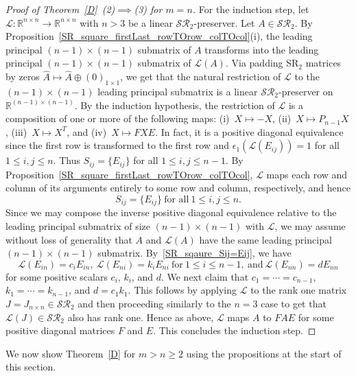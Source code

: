 \documentclass[11pt,reqno]{amsart}
\theoremstyle{plain}
\theoremstyle{definition}
\numberwithin{equation}{section}
\begin{document}
\begin{proof}[Proof of Theorem~\ref{D}~(2)$\implies$(3) for $m=n$]
	For the induction step, let $\mathcal{L}:\mathbb{R}^{n\times n}\to\mathbb{R}^{n\times n}$ with $n>3$ be a linear $\mathcal{SR}_2$-preserver. Let $A\in \mathcal{SR}_2$. By Proposition~\ref{SR_square_firstLast_rowTOrow_colTOcol}(i), the leading principal $(n-1)\times (n-1)$ submatrix of $A$ transforms into the leading principal $(n-1)\times (n-1)$  submatrix of $\mathcal{L}(A)$. Via padding SR$_2$ matrices by zeros $\widehat{A} \mapsto\widehat{A} \oplus (0)_{1 \times 1}$, we get that the natural restriction of $\mathcal{L}$ to the $(n-1)\times(n-1)$  leading principal submatrix is a linear $\mathcal{SR}_2$-preserver on $\mathbb{R}^{(n-1)\times(n-1)}$. By the induction hypothesis, the restriction of $\mathcal{L}$ is a composition of one or more of the following maps: (i)~$X\mapsto -X$, (ii)~$X\mapsto P_{n-1}X$, (iii)~$X\mapsto X^T$, and (iv)~$X\mapsto FXE$. In fact, it is a positive diagonal equivalence since the first row is transformed to the first row and $\epsilon_1(\mathcal{L}(E_{ij}))=1$ for all $1\leq i,j\leq n$. Thus $S_{ij}=\{E_{ij}\}$ for all $1\leq i,j\leq n-1$. By Proposition~\ref{SR_square_firstLast_rowTOrow_colTOcol}, $\mathcal{L}$ maps each row and column of its arguments entirely to some row and column, respectively, and hence 
	\begin{equation}\label{SR_sqaure_Sij=Eij}
		S_{ij}=\{E_{ij}\}~\text{for all}~ 1\leq i,j\leq n.
	\end{equation} 
	Since we may compose the inverse positive diagonal equivalence relative to the leading principal submatrix of size $(n-1)\times(n-1)$ with $\mathcal{L}$, we may assume without loss of generality that $A$ and $\mathcal{L}(A)$ have the same leading principal $(n-1) \times (n-1)$ submatrix. By~\eqref{SR_sqaure_Sij=Eij}, we have
	\[\mathcal{L}(E_{in})=c_iE_{in},~ \mathcal{L}(E_{ni})=k_iE_{ni} ~\text{for}~ 1\leq i\leq n-1, ~\text{and}~ \mathcal{L}(E_{nn})=dE_{nn}\]
	for some positive scalars $c_i$, $k_i$, and $d$. We next claim that
	$c_1=\cdots=c_{n-1}$, $k_1=\cdots=k_{n-1}$, and $d=c_1k_1$. This follows by applying $\mathcal{L}$ to the rank one matrix $J = J_{n \times n} \in \mathcal{SR}_2$ and then proceeding similarly to the $n=3$ case to get that $\mathcal{L}(J) \in \mathcal{SR}_2$ also has rank one. Hence as above, $\mathcal{L}$ maps $A$ to $FAE$ for some positive diagonal matrices $F$ and $E$. This concludes the induction step.
\end{proof}

We now show Theorem~\ref{D} for $m>n\geq2$ using the propositions at the start of this section.
\end{document}
